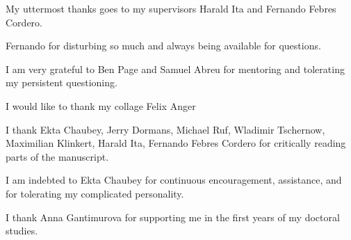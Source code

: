 {
  \setlength{\parskip}{1pt}
  My uttermost thanks goes to my supervisors Harald Ita and Fernando Febres Cordero.

  Fernando for disturbing so much and always being available for questions.

  I am very grateful to Ben Page and Samuel Abreu for mentoring  and tolerating
  my persistent questioning.


  I would like to thank my collage Felix Anger

  I thank Ekta Chaubey, Jerry Dormans, Michael Ruf, Wladimir Tschernow, Maximilian Klinkert, Harald Ita, Fernando Febres Cordero for critically reading parts of the manuscript.

  I am indebted to Ekta Chaubey for continuous encouragement, assistance, and for tolerating my complicated personality.

  I thank Anna Gantimurova for supporting me in the first years of my doctoral studies.







}
